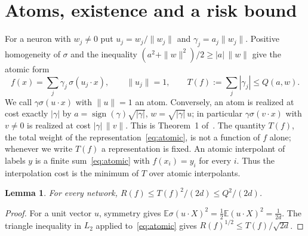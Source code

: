 \documentclass[11pt]{amsart}
\newtheorem{lemma}[theorem]{Lemma}
\theoremstyle{remark}
\numberwithin{equation}{section}
\newcommand{\EE}{\mathbb{E}}
\begin{document}
\section{Atoms, existence and a risk bound}\label{sec:atoms}
For a neuron with $w_j\neq0$ put $u_j=w_j/\|w_j\|$ and $\gamma_j=a_j\|w_j\|$. Positive homogeneity of $\sigma$ and the inequality $(a^2+\|w\|^2)/2\ge|a|\,\|w\|$ give the atomic form
\begin{equation}\label{eq:atomic}
f(x)=\sum_j\gamma_j\,\sigma(u_j\cdot x),\qquad \|u_j\|=1,\qquad T(f):=\sum_j|\gamma_j|\le Q(a,w).
\end{equation}
We call $\gamma\sigma(u\cdot x)$ with $\|u\|=1$ an atom. Conversely, an atom is realized at cost exactly $|\gamma|$ by $a=\operatorname{sign}(\gamma)\sqrt{|\gamma|}$, $w=\sqrt{|\gamma|}\,u$; in particular $\gamma\sigma(v\cdot x)$ with $v\neq0$ is realized at cost $|\gamma|\,\|v\|$. This is Theorem~1 of~\cite{NTS}. The quantity $T(f)$, the total weight of the representation~\eqref{eq:atomic}, is not a function of $f$ alone; whenever we write $T(f)$ a representation is fixed. An atomic interpolant of labels $y$ is a finite sum~\eqref{eq:atomic} with $f(x_i)=y_i$ for every $i$. Thus the interpolation cost is the minimum of $T$ over atomic interpolants.

\begin{lemma}\label{lem:risk}
For every network, $R(f)\le T(f)^2/(2d)\le Q^2/(2d)$.
\end{lemma}
\begin{proof}
For a unit vector $u$, symmetry gives $\EE\sigma(u\cdot X)^2=\frac12\EE(u\cdot X)^2=\frac1{2d}$. The triangle inequality in $L_2$ applied to~\eqref{eq:atomic} gives $R(f)^{1/2}\le T(f)/\sqrt{2d}$.
\end{proof}
\end{document}
